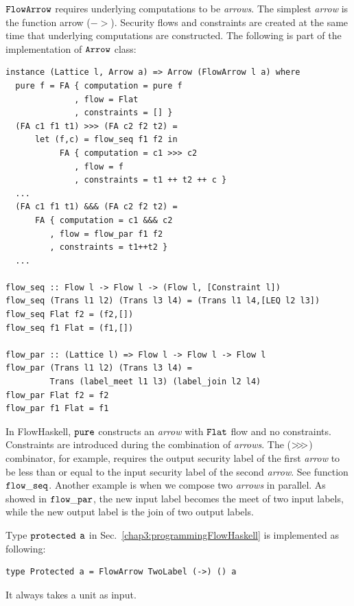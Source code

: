 \documentclass[a4paper]{report}
\newcommand{\arrowop}[1]{$#1\negthickspace #1\negthickspace #1$}
\newcommand{\co}[1]{$\cod{#1}$}
\begin{document}
\co{FlowArrow} requires underlying computations to be {\em arrows}. 
The simplest {\em arrow} is the function arrow ($->$).
Security flows and
constraints are created at the same time that underlying computations are constructed.
The following is part of the implementation of \co{Arrow} class:
\begin{Verbatim}[fontsize=\footnotesize]
instance (Lattice l, Arrow a) => Arrow (FlowArrow l a) where
  pure f = FA { computation = pure f
              , flow = Flat
              , constraints = [] }
  (FA c1 f1 t1) >>> (FA c2 f2 t2) =
      let (f,c) = flow_seq f1 f2 in
           FA { computation = c1 >>> c2
              , flow = f
              , constraints = t1 ++ t2 ++ c }
  ...
  (FA c1 f1 t1) &&& (FA c2 f2 t2) = 
      FA { computation = c1 &&& c2
         , flow = flow_par f1 f2
         , constraints = t1++t2 }
  ...

flow_seq :: Flow l -> Flow l -> (Flow l, [Constraint l])
flow_seq (Trans l1 l2) (Trans l3 l4) = (Trans l1 l4,[LEQ l2 l3])
flow_seq Flat f2 = (f2,[])
flow_seq f1 Flat = (f1,[])

flow_par :: (Lattice l) => Flow l -> Flow l -> Flow l
flow_par (Trans l1 l2) (Trans l3 l4) = 
         Trans (label_meet l1 l3) (label_join l2 l4)
flow_par Flat f2 = f2
flow_par f1 Flat = f1
\end{Verbatim}
In FlowHaskell, \co{pure} constructs an {\em arrow} with \co{Flat} flow and no constraints.
Constraints are introduced during the combination of {\em arrows}. The (\arrowop{>}) combinator,
for example, requires the output security label of the first {\em arrow} to be less than or equal to
the input security label of the second {\em arrow}. See function \co{flow\_seq}.
Another example is when we compose two {\em arrows} in parallel. As showed in
\co{flow\_par}, the new input label becomes the meet of two input labels, while the new output label is
the join of two output labels.

Type \co{protected} \co{a} in Sec.~\ref{chap3:programmingFlowHaskell} is implemented as following:
\begin{Verbatim}[fontsize=\footnotesize]
type Protected a = FlowArrow TwoLabel (->) () a
\end{Verbatim}
It always takes a unit as input.
\end{document}
